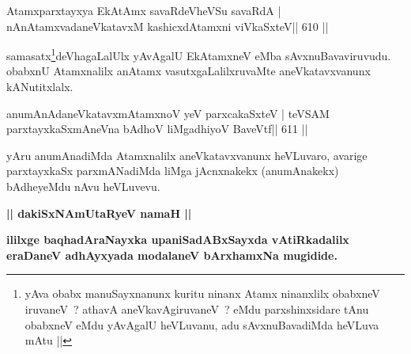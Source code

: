 \begin{shl}
Atamxparxtayxya EkAtAmx savaRdeVheVSu savaRdA |
nAnAtamxvadaneVkatavxM kashicxdAtamxni viVkaSxteV\hfill || 610 ||
\end{shl}

\begin{artha}
samasatx\footnote[1]{yAva obabx manuSayxnanunx kuritu ninanx Atamx   ninanxlilx obabxneV iruvaneV~? athavA aneVkavAgiruvaneV~? eMdu   parxshinxsidare tAnu obabxneV eMdu yAvAgalU heVLuvanu, adu   sAvxnuBavadiMda heVLuva mAtu ||}deVhagaLalUlx yAvAgalU EkAtamxneV eMba sAvxnuBavaviruvudu. obabxnU Atamxnalilx anAtamx vasutxgaLalilxruvaMte aneVkatavxvanunx kANutitxlalx.
\end{artha}

\begin{shl}
anumAnAdaneVkatavxmAtamxnoV yeV parxcakaSxteV |
teVSAM parxtayxkaSxmAneVna bAdhoV liMgadhiyoV BaveVtf\hfill || 611 ||
\end{shl}

\begin{artha}
yAru anumAnadiMda Atamxnalilx aneVkatavxvanunx heVLuvaro, avarige parxtayxkaSx parxmANadiMda liMga jAcnxnakekx (anumAnakekx) bAdheyeMdu nAvu heVLuvevu.
\end{artha}


\begin{center}
{\Large{\textbf{|| dakiSxNAmUtaRyeV namaH ||}}}

{\textbf{ililxge baqhadAraNayxka upaniSadABxSayxda vAtiRkadalilx 
eraDaneV
adhAyxyada modalaneV bArxhamxNa mugidide.}}
\end{center}
